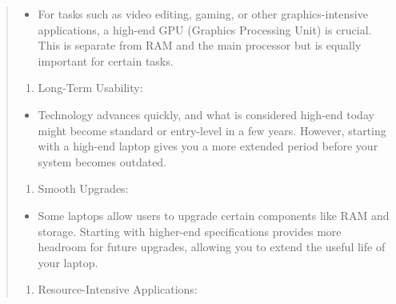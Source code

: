 \documentclass[14pt, letterpaper,twoside]{extreport}
\begin{document}
\begin{quote}
    \begin{itemize}

        \item
              For tasks such as video editing, gaming, or other graphics-intensive applications, a high-end GPU (Graphics Processing Unit) is crucial. This is separate from RAM and the main processor but is equally important for certain tasks.
    \end{itemize}
    
    \begin{enumerate}
        \def\labelenumi{\arabic{enumi}.}
        \setcounter{enumi}{3}
        
        \item
              Long-Term Usability:
    \end{enumerate}
    
    \begin{itemize}

        \item
              Technology advances quickly, and what is considered high-end today might become standard or entry-level in a few years. However, starting with a high-end laptop gives you a more extended period before your system becomes outdated.
    \end{itemize}
    
    \begin{enumerate}
        \def\labelenumi{\arabic{enumi}.}
        \setcounter{enumi}{4}
        
        \item
              Smooth Upgrades:
    \end{enumerate}
    
    \begin{itemize}

        \item
              Some laptops allow users to upgrade certain components like RAM and storage. Starting with higher-end specifications provides more headroom for future upgrades, allowing you to extend the useful life of your laptop.
    \end{itemize}
    
    \begin{enumerate}
        \def\labelenumi{\arabic{enumi}.}
        \setcounter{enumi}{5}
        
        \item
              Resource-Intensive Applications:
    \end{enumerate}
    

\end{quote}
\end{document}
